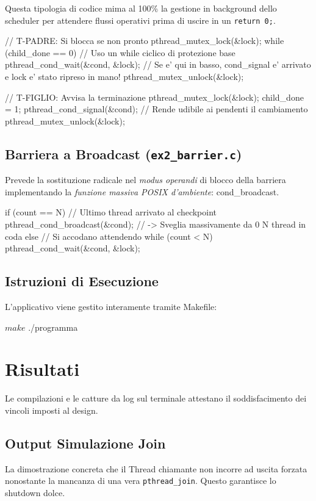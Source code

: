 \documentclass[a4paper,12pt]{article}
\begin{document}
Questa tipologia di codice mima al 100\% la gestione in background dello scheduler per attendere flussi operativi prima di uscire in un \texttt{return 0;}.
\begin{ccode}
// T-PADRE: Si blocca se non pronto
pthread_mutex_lock(&lock);
while (child_done == 0) {  // Uso un while ciclico di protezione base
    pthread_cond_wait(&cond, &lock);
}
// Se e' qui in basso, cond_signal e' arrivato e lock e' stato ripreso in mano!
pthread_mutex_unlock(&lock);

// T-FIGLIO: Avvisa la terminazione
pthread_mutex_lock(&lock);
child_done = 1;              
pthread_cond_signal(&cond); // Rende udibile ai pendenti il cambiamento
pthread_mutex_unlock(&lock);
\end{ccode}

\subsection{Barriera a Broadcast (\texttt{ex2\_barrier.c})}
Prevede la sostituzione radicale nel \textit{modus operandi} di blocco della barriera implementando la \textit{funzione massiva POSIX d'ambiente}: cond\_broadcast.
\begin{ccode}
if (count == N) {
    // Ultimo thread arrivato al checkpoint
    pthread_cond_broadcast(&cond); // -> Sveglia massivamente da 0 N thread in coda
} else {
    // Si accodano attendendo
    while (count < N) {
        pthread_cond_wait(&cond, &lock);
    }
}
\end{ccode}


\subsection{Istruzioni di Esecuzione}
L'applicativo viene gestito interamente tramite Makefile:
\begin{terminal}
$ make
$ ./programma
\end{terminal}

\section{Risultati}
Le compilazioni e le catture da log sul terminale attestano il soddisfacimento dei vincoli imposti al design.

\subsection{Output Simulazione Join}
La dimostrazione concreta che il Thread chiamante non incorre ad uscita forzata nonostante la mancanza di una vera \texttt{pthread\_join}. Questo garantisce lo shutdown dolce.
\end{document}
